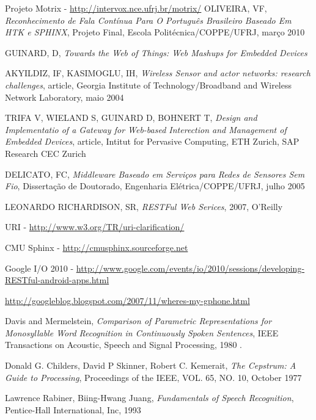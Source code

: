 \documentclass[12pt,a4paper,oneside]{report}
\begin{document}
\begin{thebibliography}{99}
	Projeto Motrix - \url{http://intervox.nce.ufrj.br/motrix/}
	OLIVEIRA, VF,
	\emph{Reconhecimento de Fala Contínua Para O Português Brasileiro Baseado Em HTK e SPHINX}, Projeto Final, Escola Politécnica/COPPE/UFRJ, março 2010

	GUINARD, D,
	\emph{Towards the Web of Things: Web Mashups for Embedded Devices}

	AKYILDIZ, IF, KASIMOGLU, IH,
	\emph{Wireless Sensor and actor networks: research challenges},
	article, Georgia Institute of Technology/Broadband and Wireless Network Laboratory, maio 2004

	TRIFA V, WIELAND S, GUINARD D, BOHNERT T,
	\emph{Design and Implementatio of a Gateway for Web-based Interection and Management of Embedded Devices},
	article, Intitut for Pervasive Computing, ETH Zurich, SAP Research CEC Zurich

	DELICATO, FC,
	\emph{Middleware Baseado em Serviços para Redes de Sensores Sem Fio},
	Dissertação de Doutorado,
	Engenharia Elétrica/COPPE/UFRJ, julho 2005

	LEONARDO RICHARDISON, SR,
	\emph{RESTFul Web Serices}, 2007, O'Reilly

	URI - \url{http://www.w3.org/TR/uri-clarification/}

	CMU Sphinx - \url{http://cmusphinx.sourceforge.net}

	Google I/O 2010 - \url{http://www.google.com/events/io/2010/sessions/developing-RESTful-android-apps.html}

	\url{http://googleblog.blogspot.com/2007/11/wheres-my-gphone.html}

	Davis and Mermelstein, 
	\emph{Comparison of Parametric Representations for Monosyllable Word Recognition in Continuously Spoken Sentences},
	IEEE Transactions on Acoustic, Speech and Signal Processing, 1980 .

	Donald G. Childers, David P Skinner, Robert C. Kemerait,
	\emph{The Cepstrum: A Guide to Processing}, 
	Proceedings of the IEEE, VOL. 65, NO. 10, October 1977

	Lawrence Rabiner, Biing-Hwang Juang,
	\emph{Fundamentals of Speech Recognition},
	Pentice-Hall International, Inc, 1993


\end{thebibliography}
\end{document}
